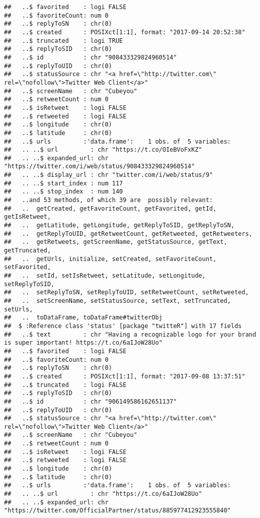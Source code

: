 \documentclass[]{article}
\begin{document}
\begin{verbatim}
##   ..$ favorited    : logi FALSE
##   ..$ favoriteCount: num 0
##   ..$ replyToSN    : chr(0) 
##   ..$ created      : POSIXct[1:1], format: "2017-09-14 20:52:38"
##   ..$ truncated    : logi TRUE
##   ..$ replyToSID   : chr(0) 
##   ..$ id           : chr "908433329824960514"
##   ..$ replyToUID   : chr(0) 
##   ..$ statusSource : chr "<a href=\"http://twitter.com\" rel=\"nofollow\">Twitter Web Client</a>"
##   ..$ screenName   : chr "Cubeyou"
##   ..$ retweetCount : num 0
##   ..$ isRetweet    : logi FALSE
##   ..$ retweeted    : logi FALSE
##   ..$ longitude    : chr(0) 
##   ..$ latitude     : chr(0) 
##   ..$ urls         :'data.frame':    1 obs. of  5 variables:
##   .. ..$ url         : chr "https://t.co/OIeBVoFxKZ"
##   .. ..$ expanded_url: chr "https://twitter.com/i/web/status/908433329824960514"
##   .. ..$ display_url : chr "twitter.com/i/web/status/9"
##   .. ..$ start_index : num 117
##   .. ..$ stop_index  : num 140
##   ..and 53 methods, of which 39 are  possibly relevant:
##   ..  getCreated, getFavoriteCount, getFavorited, getId, getIsRetweet,
##   ..  getLatitude, getLongitude, getReplyToSID, getReplyToSN,
##   ..  getReplyToUID, getRetweetCount, getRetweeted, getRetweeters,
##   ..  getRetweets, getScreenName, getStatusSource, getText, getTruncated,
##   ..  getUrls, initialize, setCreated, setFavoriteCount, setFavorited,
##   ..  setId, setIsRetweet, setLatitude, setLongitude, setReplyToSID,
##   ..  setReplyToSN, setReplyToUID, setRetweetCount, setRetweeted,
##   ..  setScreenName, setStatusSource, setText, setTruncated, setUrls,
##   ..  toDataFrame, toDataFrame#twitterObj
##  $ :Reference class 'status' [package "twitteR"] with 17 fields
##   ..$ text         : chr "Having a recognizable logo for your brand is super important! https://t.co/6aIJoW28Uo"
##   ..$ favorited    : logi FALSE
##   ..$ favoriteCount: num 0
##   ..$ replyToSN    : chr(0) 
##   ..$ created      : POSIXct[1:1], format: "2017-09-08 13:37:51"
##   ..$ truncated    : logi FALSE
##   ..$ replyToSID   : chr(0) 
##   ..$ id           : chr "906149586162651137"
##   ..$ replyToUID   : chr(0) 
##   ..$ statusSource : chr "<a href=\"http://twitter.com\" rel=\"nofollow\">Twitter Web Client</a>"
##   ..$ screenName   : chr "Cubeyou"
##   ..$ retweetCount : num 0
##   ..$ isRetweet    : logi FALSE
##   ..$ retweeted    : logi FALSE
##   ..$ longitude    : chr(0) 
##   ..$ latitude     : chr(0) 
##   ..$ urls         :'data.frame':    1 obs. of  5 variables:
##   .. ..$ url         : chr "https://t.co/6aIJoW28Uo"
##   .. ..$ expanded_url: chr "https://twitter.com/OfficialPartner/status/885977412923555840"

\end{verbatim}
\end{document}
